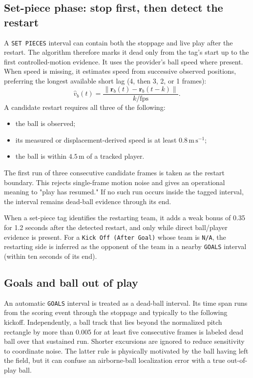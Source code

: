 \documentclass[11pt,a4paper]{article}
\begin{document}
\subsection{Set-piece phase: stop first, then detect the restart}

A \texttt{SET PIECES} interval can contain both the stoppage and live play after the restart. The
algorithm therefore marks it dead only from the tag's start up to the first controlled-motion
evidence. It uses the provider's ball speed where present. When speed is missing, it estimates speed
from successive observed positions, preferring the longest available short lag (4, then 3, 2, or 1
frames):
\[
  \widehat v_b(t)=\frac{\|\mathbf r_b(t)-\mathbf r_b(t-k)\|}{k/\mathrm{fps}}.
\]
A candidate restart requires all three of the following:
\begin{itemize}[leftmargin=*]
  \item the ball is observed;
  \item its measured or displacement-derived speed is at least $0.8\,\mathrm{m\,s^{-1}}$;
  \item the ball is within $4.5\,\mathrm{m}$ of a tracked player.
\end{itemize}
The first run of three consecutive candidate frames is taken as the restart boundary. This rejects
single-frame motion noise and gives an operational meaning to "play has resumed." If no such run
occurs inside the tagged interval, the interval remains dead-ball evidence through its end.

When a set-piece tag identifies the restarting team, it adds a weak bonus of 0.35 for 1.2 seconds
after the detected restart, and only while direct ball/player evidence is present. For a
\texttt{Kick Off (After Goal)} whose team is \texttt{N/A}, the restarting side is inferred as the
opponent of the team in a nearby \texttt{GOALS} interval (within ten seconds of its end).

\subsection{Goals and ball out of play}

An automatic \texttt{GOALS} interval is treated as a dead-ball interval. Its time span runs from the
scoring event through the stoppage and typically to the following kickoff. Independently, a ball
track that lies beyond the normalized pitch rectangle by more than 0.005 for at least five
consecutive frames is labeled dead ball over that sustained run. Shorter excursions are ignored to
reduce sensitivity to coordinate noise. The latter rule is physically motivated by the ball having
left the field, but it can confuse an airborne-ball localization error with a true out-of-play ball.
\end{document}
